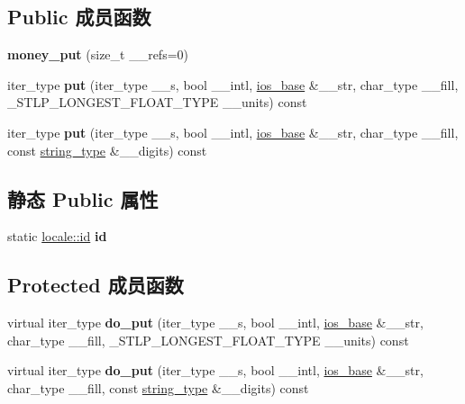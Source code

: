 \subsection*{Public 成员函数}
\begin{DoxyCompactItemize}
\item 
\mbox{\label{classmoney__put_a047252fed6af33643f11f2b1d445fcd6}} 
{\bfseries money\+\_\+put} (size\+\_\+t \+\_\+\+\_\+refs=0)
\item 
\mbox{\label{classmoney__put_a9fc81c42469ddd14555c930e6fb5cc0e}} 
iter\+\_\+type {\bfseries put} (iter\+\_\+type \+\_\+\+\_\+s, bool \+\_\+\+\_\+intl, \hyperlink{classios__base}{ios\+\_\+base} \&\+\_\+\+\_\+str, char\+\_\+type \+\_\+\+\_\+fill, \+\_\+\+S\+T\+L\+P\+\_\+\+L\+O\+N\+G\+E\+S\+T\+\_\+\+F\+L\+O\+A\+T\+\_\+\+T\+Y\+PE \+\_\+\+\_\+units) const
\item 
\mbox{\label{classmoney__put_a1df1de057767542270a8387f4867aac9}} 
iter\+\_\+type {\bfseries put} (iter\+\_\+type \+\_\+\+\_\+s, bool \+\_\+\+\_\+intl, \hyperlink{classios__base}{ios\+\_\+base} \&\+\_\+\+\_\+str, char\+\_\+type \+\_\+\+\_\+fill, const \hyperlink{classbasic__string}{string\+\_\+type} \&\+\_\+\+\_\+digits) const
\end{DoxyCompactItemize}
\subsection*{静态 Public 属性}
\begin{DoxyCompactItemize}
\item 
\mbox{\label{classmoney__put_aad5f49a5778c057e1c301e219a936d70}} 
static \hyperlink{classlocale_1_1id}{locale\+::id} {\bfseries id}
\end{DoxyCompactItemize}
\subsection*{Protected 成员函数}
\begin{DoxyCompactItemize}
\item 
\mbox{\label{classmoney__put_a1e0d2225a00ec1c43deeae618384db0d}} 
virtual iter\+\_\+type {\bfseries do\+\_\+put} (iter\+\_\+type \+\_\+\+\_\+s, bool \+\_\+\+\_\+intl, \hyperlink{classios__base}{ios\+\_\+base} \&\+\_\+\+\_\+str, char\+\_\+type \+\_\+\+\_\+fill, \+\_\+\+S\+T\+L\+P\+\_\+\+L\+O\+N\+G\+E\+S\+T\+\_\+\+F\+L\+O\+A\+T\+\_\+\+T\+Y\+PE \+\_\+\+\_\+units) const
\item 
\mbox{\label{classmoney__put_a5e8b8e934936f918404318319409f5c7}} 
virtual iter\+\_\+type {\bfseries do\+\_\+put} (iter\+\_\+type \+\_\+\+\_\+s, bool \+\_\+\+\_\+intl, \hyperlink{classios__base}{ios\+\_\+base} \&\+\_\+\+\_\+str, char\+\_\+type \+\_\+\+\_\+fill, const \hyperlink{classbasic__string}{string\+\_\+type} \&\+\_\+\+\_\+digits) const
\end{DoxyCompactItemize}


